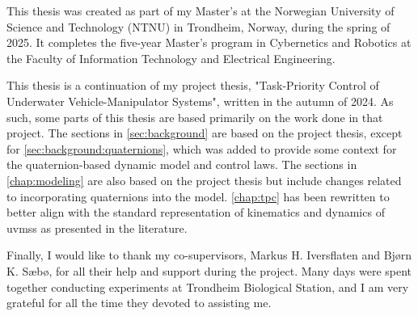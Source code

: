 This thesis was created as part of my Master's at the Norwegian University of Science and Technology (NTNU) in Trondheim, Norway, during the spring of 2025. It completes the five-year Master's program in Cybernetics and Robotics at the Faculty of Information Technology and Electrical Engineering.

This thesis is a continuation of my project thesis, "Task-Priority Control of Underwater Vehicle-Manipulator Systems", written in the autumn of 2024. As such, some parts of this thesis are based primarily on the work done in that project. The sections in \autoref{sec:background} are based on the project thesis, except for \autoref{sec:background:quaternions}, which was added to provide some context for the quaternion-based dynamic model and control laws. The sections in \autoref{chap:modeling} are also based on the project thesis but include changes related to incorporating quaternions into the model. \autoref{chap:tpc} has been rewritten to better align with the standard representation of kinematics and dynamics of \gls{uvms}s as presented in the literature.

Finally, I would like to thank my co-supervisors, Markus H. Iversflaten and Bjørn K. Sæbø, for all their help and support during the project. Many days were spent together conducting experiments at Trondheim Biological Station, and I am very grateful for all the time they devoted to assisting me.
